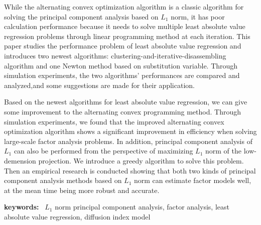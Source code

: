 While the alternating convex optimization algorithm is a classic 
algorithm for solving the principal component analysis based on $L_1$ norm, it has 
poor calculation performance because it
needs to solve multiple least absolute value regression 
problems through linear programming method at each iteration.
This paper studies the performance problem of least absolute 
value regression and introduces two newest algorithms: 
clustering-and-iterative-disassembling algorithm and
one Newton method based on substitution variable. 
Through simulation experiments, the two algorithms' performances
are compared and analyzed,and some suggestions are made for their application.

\thispagestyle{plain}

Based on the newest algorithms for least absolute value regression, 
we can give some improvement to the alternating convex programming method.
Through simulation experiments, we found that the improved alternating convex optimization algorithm
shows a significant improvement in efficiency when solving large-scale factor analysis problems. 
In addition, principal component analysis of $L_1$ can also be performed 
from the perspective of maximizing $L_1$ norm of the low-demension projection.
We introduce a greedy algorithm to solve this problem. Then an empirical research is
conducted showing that both two kinds of principal component analysis methods
based on $L_1$ norm can estimate factor models well, 
at the mean time being more robust and accurate.

\vspace{2ex}
{\bf keywords:} \ $L_1$ norm principal component analysis, factor analysis,
least absolute value regression, diffusion index model

\thispagestyle{plain}
\newpage